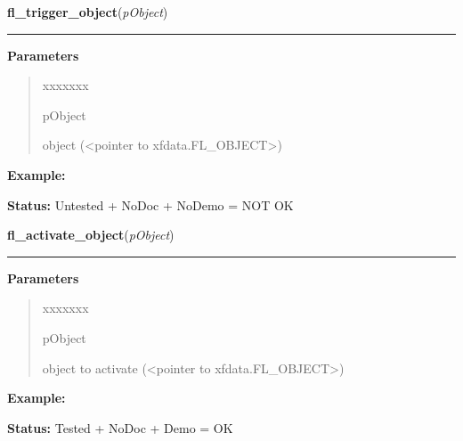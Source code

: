 \hspace{.8\funcindent}\begin{boxedminipage}{\funcwidth}

    \raggedright \textbf{fl\_trigger\_object}(\textit{pObject})

    \vspace{-1.5ex}

    \rule{\textwidth}{0.5\fboxrule}
\setlength{\parskip}{2ex}
\setlength{\parskip}{1ex}
      \textbf{Parameters}
      \vspace{-1ex}

      \begin{quote}
        \begin{Ventry}{xxxxxxx}

          \item[pObject]

          object ({\textless}pointer to xfdata.FL\_OBJECT{\textgreater})

        \end{Ventry}

      \end{quote}

\textbf{Example:} 

\textbf{Status:} Untested + NoDoc + NoDemo = NOT OK



    \end{boxedminipage}

    \label{xformslib:library:fl_activate_object}

    \vspace{0.5ex}

\hspace{.8\funcindent}\begin{boxedminipage}{\funcwidth}

    \raggedright \textbf{fl\_activate\_object}(\textit{pObject})

    \vspace{-1.5ex}

    \rule{\textwidth}{0.5\fboxrule}
\setlength{\parskip}{2ex}
\setlength{\parskip}{1ex}
      \textbf{Parameters}
      \vspace{-1ex}

      \begin{quote}
        \begin{Ventry}{xxxxxxx}

          \item[pObject]

          object to activate ({\textless}pointer to 
          xfdata.FL\_OBJECT{\textgreater})

        \end{Ventry}

      \end{quote}

\textbf{Example:} 

\textbf{Status:} Tested + NoDoc + Demo = OK



    \end{boxedminipage}

